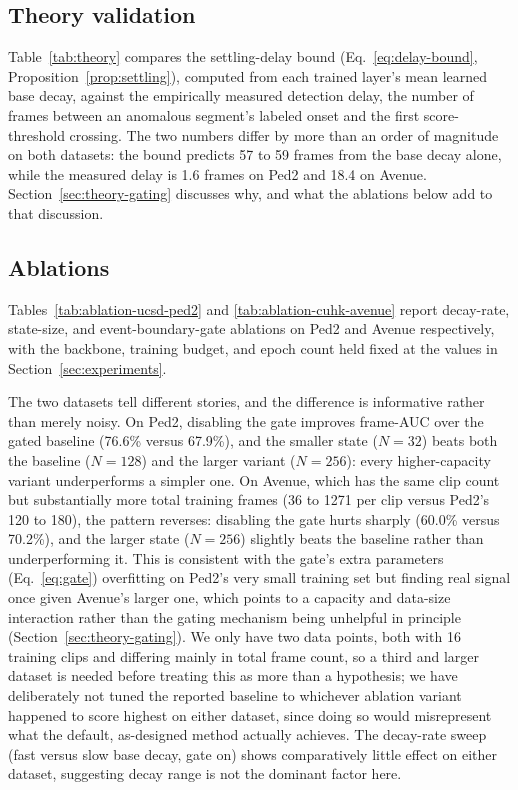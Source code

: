 

\subsection{Theory validation}
Table~\ref{tab:theory} compares the settling-delay bound (Eq.~\ref{eq:delay-bound}, Proposition~\ref{prop:settling}), computed from each trained layer's mean learned base decay, against the empirically measured detection delay, the number of frames between an anomalous segment's labeled onset and the first score-threshold crossing. The two numbers differ by more than an order of magnitude on both datasets: the bound predicts 57 to 59 frames from the base decay alone, while the measured delay is 1.6 frames on Ped2 and 18.4 on Avenue. Section~\ref{sec:theory-gating} discusses why, and what the ablations below add to that discussion.



\subsection{Ablations}
Tables~\ref{tab:ablation-ucsd-ped2} and \ref{tab:ablation-cuhk-avenue} report decay-rate, state-size, and event-boundary-gate ablations on Ped2 and Avenue respectively, with the backbone, training budget, and epoch count held fixed at the values in Section~\ref{sec:experiments}.




The two datasets tell different stories, and the difference is informative rather than merely noisy. On Ped2, disabling the gate improves frame-AUC over the gated baseline (76.6\% versus 67.9\%), and the smaller state ($N{=}32$) beats both the baseline ($N{=}128$) and the larger variant ($N{=}256$): every higher-capacity variant underperforms a simpler one. On Avenue, which has the same clip count but substantially more total training frames (36 to 1271 per clip versus Ped2's 120 to 180), the pattern reverses: disabling the gate hurts sharply (60.0\% versus 70.2\%), and the larger state ($N{=}256$) slightly beats the baseline rather than underperforming it. This is consistent with the gate's extra parameters (Eq.~\ref{eq:gate}) overfitting on Ped2's very small training set but finding real signal once given Avenue's larger one, which points to a capacity and data-size interaction rather than the gating mechanism being unhelpful in principle (Section~\ref{sec:theory-gating}). We only have two data points, both with 16 training clips and differing mainly in total frame count, so a third and larger dataset is needed before treating this as more than a hypothesis; we have deliberately not tuned the reported baseline to whichever ablation variant happened to score highest on either dataset, since doing so would misrepresent what the default, as-designed method actually achieves. The decay-rate sweep (fast versus slow base decay, gate on) shows comparatively little effect on either dataset, suggesting decay range is not the dominant factor here.

